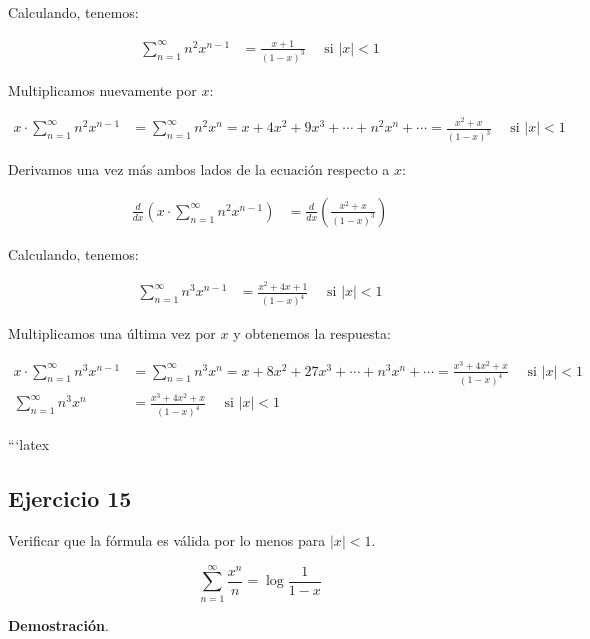 \documentclass{article}
\begin{document}
    Calculando, tenemos:

    \begin{align*}
        \sum_{n=1}^{\infty} n^2 x^{n-1} &= \frac{x + 1}{(1-x)^3} \quad \text{ si } |x| < 1
    \end{align*}

    Multiplicamos nuevamente por \(x\):

    \begin{align*}
        x \cdot \sum_{n=1}^{\infty} n^2 x^{n-1} &= \sum_{n=1}^{\infty} n^2 x^{n} = x + 4x^2 + 9x^3 + \cdots + n^2 x^n + \cdots = \frac{x^2 + x}{(1-x)^3} \quad \text{ si } |x| < 1
    \end{align*}

    Derivamos una vez más ambos lados de la ecuación respecto a \(x\):

    \begin{align*}
        \frac{d}{dx} \left( x \cdot \sum_{n=1}^{\infty} n^2 x^{n-1} \right) &= \frac{d}{dx} \left( \frac{x^2 + x}{(1-x)^3} \right)
    \end{align*}

    Calculando, tenemos:

    \begin{align*}
        \sum_{n=1}^{\infty} n^3 x^{n-1} &= \frac{x^2 + 4x + 1}{(1-x)^4} \quad \text{ si } |x| < 1
    \end{align*}

    Multiplicamos una última vez por \(x\) y obtenemos la respuesta:

    \begin{align*}
        x \cdot \sum_{n=1}^{\infty} n^3 x^{n-1} &= \sum_{n=1}^{\infty} n^3 x^{n} = x + 8x^2 + 27x^3 + \cdots + n^3 x^n + \cdots = \frac{x^3 + 4x^2 + x}{(1-x)^4} \quad \text{ si } |x| < 1 \\
        \sum_{n=1}^{\infty} n^3 x^{n} &= \frac{x^3 + 4x^2 + x}{(1-x)^4} \quad \text{ si } |x| < 1
    \end{align*}

    ```latex
    \subsection*{Ejercicio 15}

    Verificar que la fórmula es válida por lo menos para $|x|<1$.

    $$
    \sum_{n=1}^{\infty} \frac{x^{n}}{n} = \log \frac{1}{1-x}
    $$

    \textbf{Demostración}.\\
\end{document}
